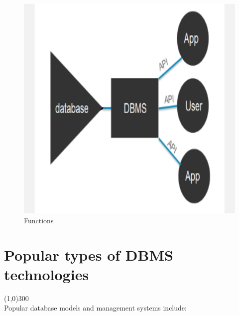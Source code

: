 \documentclass{article}
\begin{document}
\begin{figure}[h]
\centering
\includegraphics[width=\linewidth5]{1.jpg}

\caption{Functions}
\end{figure}






\newpage
\section{Popular types of DBMS technologies}
\line(1,0){300}\\
Popular database models and management systems include:
\end{document}
